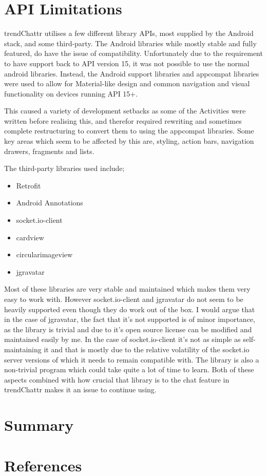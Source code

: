 \documentclass[11pt,english,numbers=endperiod,parskip=half]{scrartcl}
\begin{document}
\section{API Limitations}
  trendChattr utilises a few different library APIs, most supplied by the
  Android stack, and some third-party. The Android libraries while mostly stable
  and fully featured, do have the issue of compatibility. Unfortunately due to
  the requirement to have support back to API version 15, it was not possible to
  use the normal android libraries. Instead, the Android support libraries and
  appcompat libraries were used to allow for Material-like design and common
  navigation and visual functionality on devices running API 15+.

  This caused a variety of development setbacks as some of the Activities were
  written before realising this, and therefor required rewriting and sometimes
  complete restructuring to convert them to using the appcompat libraries. Some
  key areas which seem to be affected by this are, styling, action bars,
  navigation drawers, fragments and lists.

  The third-party libraries used include;
  \begin{itemize}
    \item{Retrofit}
    \item{Android Annotations}
    \item{socket.io-client}
    \item{cardview}
    \item{circularimageview}
    \item{jgravatar}
  \end{itemize}
  Most of these libraries are very stable and maintained which makes them very
  easy to work with. However socket.io-client and jgravatar do not seem to be
  heavily supported even though they do work out of the box. I would argue that
  in the case of jgravatar, the fact that it's not supported is of minor
  importance, as the library is trivial and due to it's open source license can
  be modified and maintained easily by me. In the case of socket.io-client it's
  not as simple as self-maintaining it and that is mostly due to the relative
  volatility of the socket.io server versions of which it needs to remain
  compatible with. The library is also a non-trivial program which could take
  quite a lot of time to learn. Both of these aspects combined with how crucial
  that library is to the chat feature in trendChattr makes it an issue to
  continue using.
\section{Summary}
\section{References}
\end{document}
